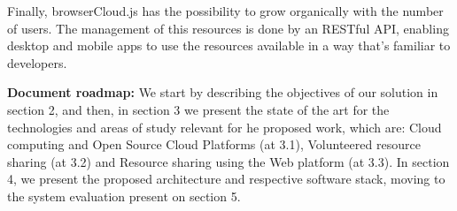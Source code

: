 Finally, browserCloud.js has the possibility to grow organically with the number of users. The management of this resources is done by an RESTful API, enabling desktop and mobile apps to use the resources available in a way that's familiar to developers. 


\textbf{Document roadmap:} We start by describing the objectives of our solution in section 2, and then, in section 3 we present the state of the art for the technologies and areas of study relevant for he proposed work, which are: Cloud computing and Open Source Cloud Platforms (at 3.1), Volunteered resource sharing (at 3.2) and Resource sharing using the Web platform (at 3.3). In section 4, we present the proposed architecture and respective software stack, moving to the system evaluation present on section 5.